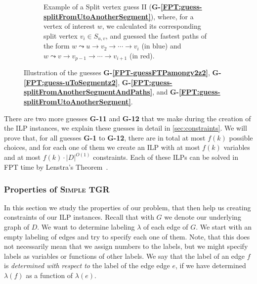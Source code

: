 \documentclass[a4paper,UKenglish,cleveref, autoref, thm-restate]{lipics-v2021}
\newcommand{\deltaExact}{\textsc{Simple TGR}}
\begin{document}
\begin{figure}[t]
\begin{subfigure}[b]{0.48\textwidth}
		\caption{Example of a Split vertex guess II (\textcolor{lipicsGray}{\textsf{\textbf{G-\ref{FPT:guess-splitFromUtoAnotherSegment}}}}), where, for a vertex of interest $w$, 
			we
			calculated its corresponding split vertex $v_i \in S_{u,v}$,
			and guessed the fastest paths of the form
			$w \leadsto u \rightarrow v_2 \rightarrow \cdots \rightarrow v_i$  (in blue) 
			and $w \leadsto v \rightarrow v_{p-1} \rightarrow \cdots \rightarrow v_{i+1}$ (in red). 
			\label{fig:FPT-guessG7}}
	\end{subfigure}
	\caption{Illustration of the guesses \textcolor{lipicsGray}{\textsf{\textbf{G-\ref{FPT-guessFTPamongv2z2}}}}, \textcolor{lipicsGray}{\textsf{\textbf{G-\ref{FPT:guess-uToSegmentz2}}}}, \textcolor{lipicsGray}{\textsf{\textbf{G-\ref{FPT:guess-splitFromAnotherSegmentAndPaths}}}}, and \textcolor{lipicsGray}{\textsf{\textbf{G-\ref{FPT:guess-splitFromUtoAnotherSegment}}}}.}
\end{figure}
%

There are two more guesses \textcolor{lipicsGray}{\textsf{\textbf{G-11}}} and \textcolor{lipicsGray}{\textsf{\textbf{G-12}}} that we make during the creation of the ILP instances, we explain these guesses in detail in \cref{sec:constraints}. 
We will prove that, for all guesses \textcolor{lipicsGray}{\textsf{\textbf{G-1}}} to \textcolor{lipicsGray}{\textsf{\textbf{G-12}}}, there are in total at most $f(k)$ possible choices, and for each one of them we create an ILP with at most $f(k)$ variables and at most $f(k)\cdot |D|^{O(1)}$ constraints. Each of these ILPs can be solved in FPT time by Lenstra's Theorem~\cite{Lenstra1983Integer}.

\subsubsection{Properties of \deltaExact}

In this section we study the properties of our problem, that then help us creating constraints of our ILP instances.
Recall that with $G$ we denote our underlying graph of $D$. We want to determine labeling $\lambda$ of each edge of $G$.
We start with an empty labeling of edges and try to specify each one of them.
Note, that this does not necessarily mean that we assign numbers to the labels, but we might specify labels as variables or functions of other labels.
We say that the label of an edge $f$ is \emph{determined with respect to} the label of the edge edge $e$, if we have determined $\lambda(f)$ as a function of $\lambda(e)$. 
\end{document}
